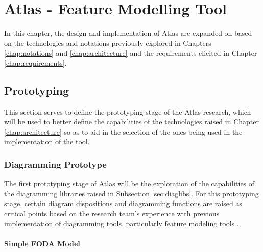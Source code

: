 \chapter{Atlas - Feature Modelling Tool}
\label{chap:atlas}

In this chapter, the design and implementation of Atlas are expanded on based on the technologies and notations previously explored in Chapters \ref{chap:notations} and \ref{chap:architecture} and the requirements elicited in Chapter \ref{chap:requirements}.


\section{Prototyping}

This section serves to define the prototyping stage of the Atlas research, which will be used to better define the capabilities of the technologies raised in Chapter \ref{chap:architecture} so as to aid in the selection of the ones being used in the implementation of the tool.


\subsection{Diagramming Prototype}

The first prototyping stage of Atlas will be the exploration of the capabilities of the diagramming libraries raised in Subsection \ref{sec:diaglibs}. For this prototyping stage, certain diagram dispositions and diagramming functions are raised as critical points based on the research team's experience with previous implementation of diagramming tools, particularly feature modeling tools \cite{LASER:2015b} \cite{RODRIGUES:2014}.


\subsubsection{Simple FODA Model}


